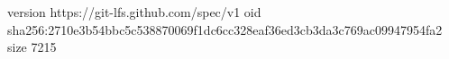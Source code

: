 version https://git-lfs.github.com/spec/v1
oid sha256:2710e3b54bbc5c538870069f1dc6cc328eaf36ed3cb3da3c769ac09947954fa2
size 7215

